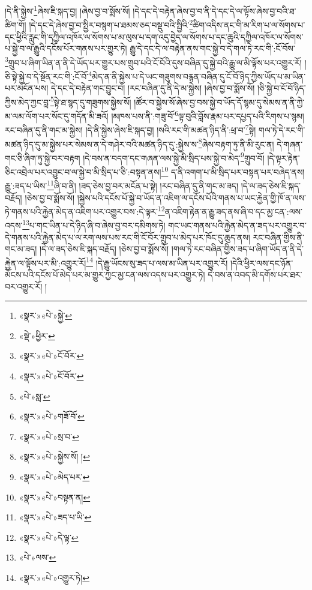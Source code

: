 །དེ་ནི་སྐྱེས་\footnote{«སྣར་»«པེ་»སྐྱེ་}ཞེས་ཇི་སྐད་བྱ། །ཞེས་བྱ་བ་སྨོས་སོ། །དེ་དང་དེ་བརྟེན་ཞེས་བྱ་བ་ནི་དེ་དང་དེ་ལ་ལྟོས་ཞེས་བྱ་བའི་ཐ་ཚིག་གོ། །དེ་དང་དེ་ཞེས་བྱ་བ་སྤྱིར་བསྙག་པ་ཐམས་ཅད་བསྡུ་བའི་སྤྱིའི་\footnote{«སྡེ་»ཕྱིར་}ཚིག་འདིས་ནང་གི་མ་རིག་པ་ལ་སོགས་པ་དང་ཕྱིའི་རླུང་གི་དཀྱིལ་འཁོར་ལ་སོགས་པ་མ་ལུས་པ་དག་འདུ་བྱེད་ལ་སོགས་པ་དང་ཆུའི་དཀྱིལ་འཁོར་ལ་སོགས་པ་སྐྱེ་བ་ལ་རྒྱུའི་དངོས་པོར་གནས་པར་གྱུར་ཏེ། རྒྱུ་དེ་དང་དེ་ལ་བརྟེན་ནས་གང་སྐྱེ་བ་དེ་གལ་ཏེ་རང་གི་:ངོ་བོས་\footnote{«སྣར་»«པེ་»ངོ་བོར་}གྲུབ་པ་ཞིག་ཡིན་ན་ནི་དེ་ཡོད་པར་གྱུར་པས་གྲུབ་པའི་ངོ་བོའི་དུས་བཞིན་དུ་སྐྱེ་བའི་རྒྱུ་ལ་མི་ལྟོས་པར་འགྱུར་རོ། །ཅི་སྟེ་སྐྱེ་བ་དེ་སྔོན་རང་གི་:ངོ་བོ་\footnote{«སྣར་»«པེ་»ངོ་བོར་}མེད་ན་ནི་སྐྱེས་པ་དེ་ཡང་གཟུགས་བརྙན་བཞིན་དུ་ངོ་བོ་ཉིད་ཀྱིས་ཡོད་པ་མ་ཡིན་པར་མངོན་པས། དེ་དང་དེ་བརྟེན་གང་བྱུང་བ། །རང་བཞིན་དུ་ནི་དེ་མ་སྐྱེས། །ཞེས་བྱ་བ་སྨོས་སོ། །ཅི་སྐྱེ་བ་ངོ་བོ་ཉིད་ཀྱིས་མེད་ཀྱང་བླ་\footnote{«པེ་»སླ་}སྟེ་ཐ་སྙད་དུ་གཟུགས་སྐྱེས་སོ། །ཚོར་བ་སྐྱེས་སོ་ཞེས་བྱ་བས་སྐྱེ་བ་ཡོད་དོ་སྙམ་དུ་སེམས་ན་ནི་ཀྱེ་མ་ལམ་ལོག་པར་སོང་དུ་གདོན་མི་ཟའོ། །མཁས་པས་ནི་:གཟུ་བོ་\footnote{«སྣར་»«པེ་»གཟོ་བོ་}ལྟ་བུའི་བློས་རྣམ་པར་དཔྱད་པའི་རིགས་པ་སྙམ། རང་བཞིན་དུ་ནི་གང་མ་སྐྱེས། །དེ་ནི་སྐྱེས་ཞེས་ཇི་སྐད་བྱ། །སའི་རང་གི་མཚན་ཉིད་ནི་:ཕྲ་བ་\footnote{«སྣར་»«པེ་»སྲ་བ་}སྟེ། གལ་ཏེ་དེ་རང་གི་མཚན་ཉིད་དུ་མ་སྐྱེས་པར་སེམས་ན་དེ་གཤེར་བའི་མཚན་ཉིད་དུ་:སྐྱེས་ས་\footnote{«སྣར་»«པེ་»སྐྱེས་སོ། །}ཞེས་བརྟག་ཏུ་ནི་མི་རུང་ན། དེ་གཞན་གང་ཅི་ཞིག་ཏུ་སྐྱེ་བར་བརྟག །དེ་བས་ན་བདག་དང་གཞན་ལས་སྐྱེ་མི་སྲིད་པས་སྐྱེ་བ་མེད་\footnote{«སྣར་»«པེ་»མེད་པར་}གྲུབ་བོ། །དེ་ལྟར་རྟེན་ཅིང་འབྲེལ་པར་འབྱུང་བ་ལ་སྐྱེ་བ་མི་སྲིད་པ་ཅི་:བསྟན་ནས།\footnote{«སྣར་»«པེ་»བསྟན་ན།} ད་ནི་འགག་པ་མི་སྲིད་པར་བསྟན་པར་བཞེད་ནས། རྒྱུ་:ཟད་པ་ཡིས་\footnote{«སྣར་»«པེ་»ཟད་པ་ཡི་}ཞི་བ་ནི། །ཟད་ཅེས་བྱ་བར་མངོན་པ་སྟེ། །རང་བཞིན་དུ་ནི་གང་མ་ཟད། །དེ་ལ་ཟད་ཅེས་ཇི་སྐད་བརྗོད། །ཅེས་བྱ་བ་སྨོས་སོ། །སྐྱེས་པའི་དངོས་པོ་སྐྱེ་བ་ཡོད་ན་འཇིག་ལ་དངོས་པོའི་གནས་པ་ཡང་རྐྱེན་གྱི་ཁོ་ན་ལས་ཏེ་གནས་པའི་རྐྱེན་མེད་ན་འཇིག་པར་འགྱུར་བས་:དེ་ལྟར་\footnote{«སྣར་»«པེ་»དེ་ལྟ་}ན་འཇིག་རྟེན་ན་རྒྱུ་ཟད་ནས་ཞི་བ་དང་མྱ་ངན་:ལས་འདས་\footnote{«པེ་»ལས་}པ་གང་ཡིན་པ་དེ་ཉིད་ཞི་བ་ཞེས་བྱ་བར་དམིགས་ཏེ། གང་ཡང་གནས་པའི་རྐྱེན་མེད་ན་ཟད་པར་འགྱུར་བ་དེ་གནས་པའི་རྐྱེན་མེད་པ་ལ་རག་ལས་པས་རང་གི་ངོ་བོར་གྲུབ་པ་མེད་པར་ཁོང་དུ་ཆུད་ནས། རང་བཞིན་གྱིས་ནི་གང་མ་ཟད། །དེ་ལ་ཟད་ཅེས་ཇི་སྐད་བརྗོད། །ཅེས་བྱ་བ་སྨོས་སོ། །གལ་ཏེ་རང་བཞིན་གྱིས་ཟད་པ་ཞིག་ཡོད་ན་ནི་དེ་རྐྱེན་ལ་ལྟོས་པར་མི་:འགྱུར་རོ།\footnote{«སྣར་»«པེ་»འགྱུར་ཏེ།} །དེ་རྒྱུ་ཡོངས་སུ་ཟད་པ་ལས་མ་ཡིན་པར་འགྱུར་རོ། །དེའི་ཕྱིར་ལས་དང་ཉོན་མོངས་པའི་དངོས་པོ་མེད་པར་མ་གྱུར་ཀྱང་མྱ་ངན་ལས་འདས་པར་འགྱུར་ཏེ། དེ་བས་ན་འབད་མི་དགོས་པར་ཐར་བར་འགྱུར་རོ། །
